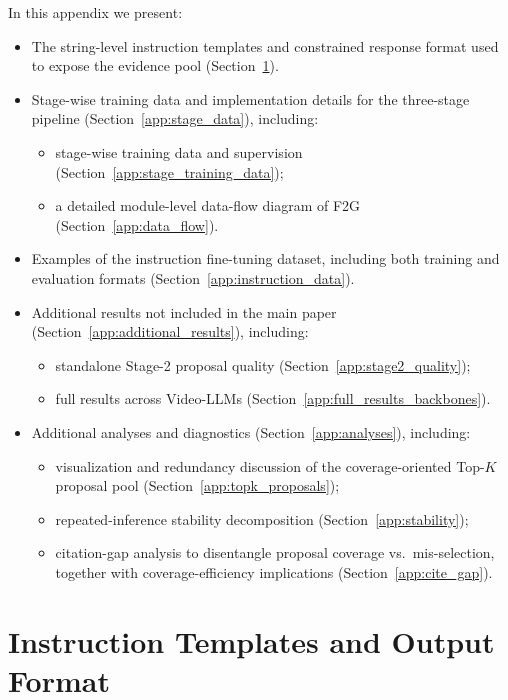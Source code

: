 \documentclass{article}
\theoremstyle{plain}
\theoremstyle{definition}
\theoremstyle{remark}
\begin{document}
In this appendix we present:
\begin{itemize}
    \item The string-level instruction templates and constrained response format used to expose the evidence pool (Section~\ref{app:serialization}).
    \item Stage-wise training data and implementation details for the three-stage pipeline (Section~\ref{app:stage_data}), including:
    \begin{itemize}
        \item stage-wise training data and supervision (Section~\ref{app:stage_training_data});
        \item a detailed module-level data-flow diagram of F2G (Section~\ref{app:data_flow}).
    \end{itemize}
    \item Examples of the instruction fine-tuning dataset, including both training and evaluation formats (Section~\ref{app:instruction_data}).
    \item Additional results not included in the main paper (Section~\ref{app:additional_results}), including:
    \begin{itemize}
    \item standalone Stage-2 proposal quality (Section~\ref{app:stage2_quality});
    \item full results across Video-LLMs (Section~\ref{app:full_results_backbones}).
    \end{itemize}
    \item Additional analyses and diagnostics (Section~\ref{app:analyses}), including:
    \begin{itemize}
        \item visualization and redundancy discussion of the coverage-oriented Top-$K$ proposal pool (Section~\ref{app:topk_proposals});
        \item repeated-inference stability decomposition (Section~\ref{app:stability});
        \item citation-gap analysis to disentangle proposal coverage vs.\ mis-selection, together with coverage-efficiency implications (Section~\ref{app:cite_gap}).
    \end{itemize}
\end{itemize}


\section{Instruction Templates and Output Format}
\label{app:serialization}
\end{document}
